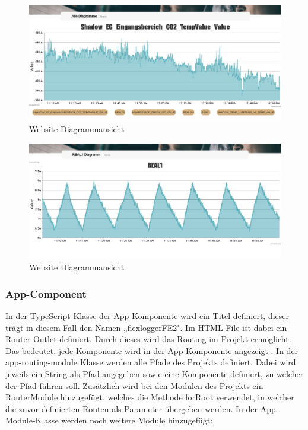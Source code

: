 \begin{figure}
\centering
\includegraphics[scale=0.35]{pics/FlexLoggerWebsiteDiagramm.jpg}
\caption{Website Diagrammansicht}
\label{fig:impl:FlexLoggerDiagrammAnsicht}
\end{figure}


\begin{figure}
    \centering
    \includegraphics[scale=0.35]{pics/FlexLoggerWebsiteDiagrammOne.jpg}
    \caption{Website Diagrammansicht}
    \label{fig:impl:FlexLoggerDiagrammAnsichtOne}
    \end{figure}

\subsubsection{App-Component}
In der TypeScript Klasse der App-Komponente wird ein Titel definiert, dieser trägt in diesem Fall den Namen „flexloggerFE2". Im HTML-File ist dabei ein Router-Outlet definiert. Durch dieses wird das Routing im Projekt ermöglicht. Das bedeutet, jede Komponente wird in der App-Komponente angezeigt %
. In der app-routing-module Klasse werden alle Pfade des Projekts definiert. Dabei wird jeweils ein String als Pfad angegeben sowie eine Komponente definiert, zu welcher der Pfad führen soll. Zusätzlich wird bei den Modulen des Projekts ein RouterModule hinzugefügt, welches die Methode forRoot verwendet, in welcher die zuvor definierten Routen als Parameter übergeben werden. In der App-Module-Klasse werden noch weitere Module hinzugefügt:


